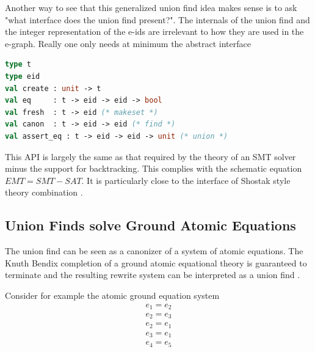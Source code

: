 \documentclass[sigconf]{acmart}
\begin{document}



Another way to see that this generalized union find idea makes sense is to ask "what interface does the union find present?". The internals of the union find and the integer representation of the e-ids are irrelevant to how they are used in the e-graph. Really one only needs at minimum the abstract interface

\begin{lstlisting}[language=Caml]
type t
type eid
val create : unit -> t
val eq     : t -> eid -> eid -> bool
val fresh  : t -> eid (* makeset *)
val canon  : t -> eid -> eid (* find *)
val assert_eq : t -> eid -> eid -> unit (* union *)
\end{lstlisting}

This API is largely the same as that required by the theory of an SMT solver minus the support for backtracking. This complies with the schematic equation $EMT = SMT - SAT$. It is particularly close to the interface of Shostak style theory combination \cite{shostaklight}. 

\subsection{Union Finds solve Ground Atomic Equations}

The union find can be seen as a canonizer of a system of atomic equations. The Knuth Bendix completion of a ground atomic equational theory is guaranteed to terminate and the resulting rewrite system can be interpreted as a union find \cite{groundegraph2024}. 

Consider for example the atomic ground equation system 
 \label{groundeq}
\begin{equation}
\begin{split}
e_1 = e_2 \\
e_2 = e_3  \\
e_2 = e_1  \\
e_3 = e_1  \\
e_4 = e_5  \\
\end{split}
\end{equation}
\end{document}
